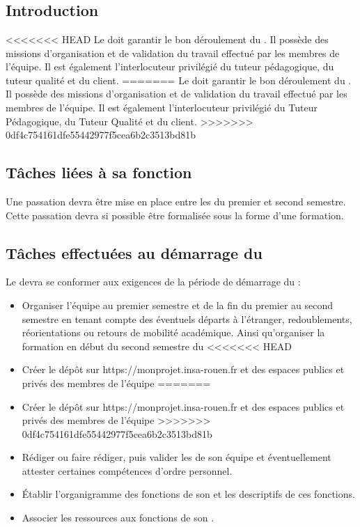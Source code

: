 \section{\CP}
\subsection*{Introduction}

<<<<<<< HEAD
Le \CP{} doit garantir le bon déroulement du \PICCourt. Il possède des missions d’organisation et de validation du travail effectué par les membres de l’équipe. Il est également l’interlocuteur privilégié du tuteur pédagogique, du tuteur qualité et du client.
=======
Le \CP{} doit garantir le bon déroulement du \PICCourt. Il possède des missions d’organisation et de validation du travail effectué par les membres de l’équipe. Il est également l’interlocuteur privilégié du Tuteur Pédagogique, du Tuteur Qualité et du client.
>>>>>>> 0df4c754161dfe55442977f5cea6b2c3513bd81b

\subsection*{Tâches liées à sa fonction}

Une passation devra être mise en place entre les \CPs{} du premier et second semestre. Cette passation devra si possible être formalisée sous la forme d’une formation.

\subsection*{Tâches effectuées au démarrage du \PICCourt}

Le \CP{} devra se conformer aux exigences de la période de démarrage du \PICCourt :
\begin{itemize}
	\item Organiser l’équipe \PICCourt au premier semestre et de la fin du premier au second semestre en tenant compte des éventuels départs à l’étranger, redoublements, réorientations ou retours de mobilité académique. Ainsi qu’organiser la formation en début du second semestre du \PICCourt
<<<<<<< HEAD
	\item Créer le dépôt \git{} sur https://monprojet.insa-rouen.fr et des espaces publics et privés des membres de l’équipe \PICCourt
=======
	\item Créer le dépôt \git sur https://monprojet.insa-rouen.fr et des espaces publics et privés des membres de l’équipe \PICCourt
>>>>>>> 0df4c754161dfe55442977f5cea6b2c3513bd81b
	\item Rédiger ou faire rédiger, puis valider les \FC{} de son équipe et éventuellement attester certaines compétences d’ordre personnel.
	\item Établir l’organigramme des fonctions de son \PICCourt et les descriptifs de ces fonctions.
	\item Associer les ressources aux fonctions de son \PICCourt.
\end{itemize}

